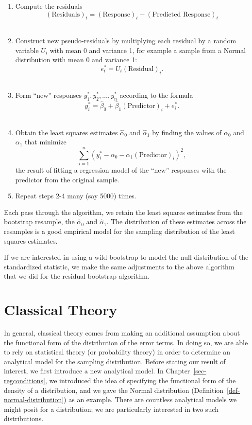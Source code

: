 \documentclass[
  letterpaper,
  DIV=11,
  numbers=noendperiod]{scrreprt}
\providecommand{\tightlist}{%
  \setlength{\itemsep}{0pt}\setlength{\parskip}{0pt}}\usepackage{longtable,booktabs,array}
\theoremstyle{plain}
\theoremstyle{definition}
\theoremstyle{definition}
\theoremstyle{remark}
\begin{document}
\begin{enumerate}
\def\labelenumi{\arabic{enumi}.}
\tightlist
\item
  Compute the residuals
  \[(\text{Residuals})_i = (\text{Response})_i - (\text{Predicted Response})_i\]\\
\item
  Construct new pseudo-residuals by multiplying each residual by a
  random variable \(U_i\) with mean 0 and variance 1, for example a
  sample from a Normal distribution with mean 0 and variance 1:
  \[e_i^* = U_i (\text{Residual})_i.\]\\
\item
  Form ``new'' responses \(y_1^*, y_2^*, \dotsc, y_n^*\) according to
  the formula
  \[y_i^* = \widehat{\beta}_0 + \widehat{\beta}_1 (\text{Predictor})_i + e_i^*.\]\\
\item
  Obtain the least squares estimates \(\widehat{\alpha}_0\) and
  \(\widehat{\alpha}_1\) by finding the values of \(\alpha_0\) and
  \(\alpha_1\) that minimize
  \[\sum_{i=1}^{n} \left(y_i^* - \alpha_0 - \alpha_1 (\text{Predictor})_i\right)^2,\]
  the result of fitting a regression model of the ``new'' responses with
  the predictor from the original sample.\\
\item
  Repeat steps 2-4 many (say 5000) times.
\end{enumerate}

Each pass through the algorithm, we retain the least squares estimates
from the bootstrap resample, the \(\widehat{\alpha}_0\) and
\(\widehat{\alpha}_1\). The distribution of these estimates across the
resamples is a good empirical model for the sampling distribution of the
least squares estimates.

If we are interested in using a wild bootstrap to model the null
distribution of the standardized statistic, we make the same adjustments
to the above algorithm that we did for the residual bootstrap algorithm.

\section{Classical Theory}\label{classical-theory}

In general, classical theory comes from making an additional assumption
about the functional form of the distribution of the error terms. In
doing so, we are able to rely on statistical theory (or probability
theory) in order to determine an analytical model for the sampling
distribution. Before stating our result of interest, we first introduce
a new analytical model. In Chapter~\ref{sec-regconditions}, we
introduced the idea of specifying the functional form of the density of
a distribution, and we gave the Normal distribution
(Definition~\ref{def-normal-distribution}) as an example. There are
countless analytical models we might posit for a distribution; we are
particularly interested in two such distributions.
\end{document}
